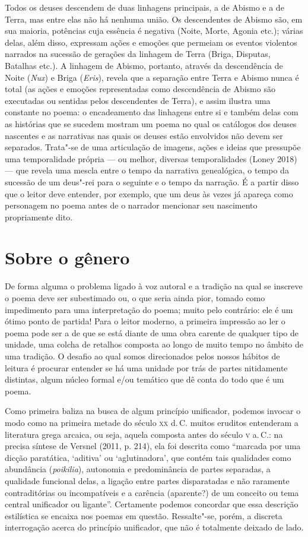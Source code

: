 Todos os deuses descendem de duas linhagens principais, a de Abismo e a
de Terra, mas entre elas não há nenhuma união. Os descendentes de Abismo
são, em sua maioria, potências cuja essência é negativa (Noite, Morte,
Agonia etc.); várias delas, além disso, expressam ações e emoções que
permeiam os eventos violentos narrados na sucessão de gerações da
linhagem de Terra (Briga, Disputas, Batalhas etc.). A linhagem de
Abismo, portanto, através da descendência de Noite (\emph{Nux}) e Briga
(\emph{Eris}), revela que a separação entre Terra e Abismo nunca é total
(as ações e emoções representadas como descendência de Abismo são
executadas ou sentidas pelos descendentes de Terra), e assim ilustra uma
constante no poema: o encadeamento das linhagens entre si e também delas
com as histórias que se sucedem mostram um poema no qual os catálogos
dos deuses nascentes e as narrativas nas quais os deuses estão
envolvidos não devem ser separados. Trata"-se de uma articulação de
imagens, ações e ideias que pressupõe uma temporalidade própria --- ou
melhor, diversas temporalidades (Loney 2018) --- que revela uma mescla
entre o tempo da narrativa genealógica, o tempo da sucessão de um
deus"-rei para o seguinte e o tempo da narração. É a partir disso que o
leitor deve entender, por exemplo, que um deus às vezes já apareça como
personagem no poema antes de o narrador mencionar seu nascimento
propriamente dito.

\section{Sobre o gênero}

De forma alguma o problema ligado à voz autoral e a tradição na qual se
inscreve o poema deve ser subestimado ou, o que seria ainda pior, tomado
como impedimento para uma interpretação do poema; muito pelo contrário:
ele é um ótimo ponto de partida! Para o leitor moderno, a primeira
impressão ao ler o poema pode ser a de que se está diante de uma obra
carente de qualquer tipo de unidade, uma colcha de retalhos composta ao
longo de muito tempo no âmbito de uma tradição. O desafio ao qual somos
direcionados pelos nossos hábitos de leitura é procurar entender se há
uma unidade por trás de partes nitidamente distintas, algum núcleo
formal e/ou temático que dê conta do todo que é um poema.

Como primeira baliza na busca de algum princípio unificador, podemos
invocar o modo como na primeira metade do século \textsc{xx} d.\,C. muitos
eruditos entenderam a literatura grega arcaica, ou seja, aquela composta
antes do século \textsc{v} a.\,C.: na precisa síntese de Versnel (2011, p. 214),
ela foi descrita como ``marcada por uma dicção paratática, `aditiva' ou
`aglutinadora', que contém tais qualidades como abundância
(\emph{poikilia}), autonomia e predominância de partes separadas, a
qualidade funcional delas, a ligação entre partes disparatadas e não
raramente contraditórias ou incompatíveis e a carência (aparente?) de um
conceito ou tema central unificador ou ligante''. Certamente podemos
concordar que essa descrição estilística se encaixa nos poemas em questão.
Ressalte"-se, porém, a discreta interrogação acerca do princípio
unificador, que não é totalmente deixado de lado.


